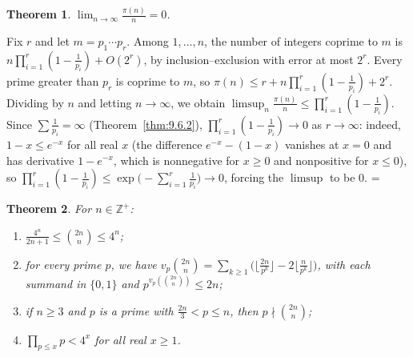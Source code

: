\documentclass[11pt]{article}
\makeatletter
\let\nt@closedisplay\]
\def\nt@guardedclose{\@ifnextchar\par{\nt@closeafterpar}{\@ifnextchar\end{\postdisplaypenalty\@M\nt@closedisplay}{\nt@closedisplay}}}
\def\nt@closeafterpar\par{\@ifnextchar\par{\nt@closeafterpar}{\@ifnextchar\end{\postdisplaypenalty\@M\nt@closedisplay\par}{\nt@closedisplay\par}}}
\renewenvironment{proof}[1][\proofname]{\par
  \pushQED{\qed}\normalfont\topsep\medskipamount\edef\nt@afterproof{\@endparpenalty=\the\@endparpenalty\relax}\@beginparpenalty\@M\@endparpenalty\@M\let\]\nt@guardedclose\trivlist\item[]\textit{#1\@addpunct{.}} \ignorespaces}{\ifvmode\addpenalty\@M\fi\popQED\nt@afterproof\endtrivlist\@endpefalse}
\theoremstyle{ntstyle}
\newtheorem{theorem}{Theorem}[subsection]
\makeatother
\begin{document}
\begin{theorem}\label{thm:9.6.3}
  $\lim_{n\to\infty}\tfrac{\pi(n)}{n} = 0$.

\end{theorem}

\begin{proof} Fix $r$ and let $m = p_1\cdots p_r$. Among
  $1,\ldots,n$, the number of integers coprime to $m$ is
  $n\prod_{i=1}^r(1-\tfrac{1}{p_i}) + O(2^r)$, by inclusion--exclusion with
  error at most $2^r$. Every prime greater than $p_r$ is coprime to $m$, so
  $\pi(n) \le r + n\prod_{i=1}^r(1-\tfrac{1}{p_i}) + 2^r$. Dividing by
  $n$ and letting $n\to\infty$, we obtain $\limsup_n \tfrac{\pi(n)}{n} \le \prod_{i=1}^r(1-\tfrac{1}{p_i})$. Since
  $\sum\tfrac{1}{p_i}=\infty$
  (Theorem~\ref{thm:9.6.2}), $\prod_{i=1}^r(1-\tfrac{1}{p_i})\to 0$ as
  $r\to\infty$: indeed, $1-x\le e^{-x}$ for all real $x$ (the difference
  $e^{-x}-(1-x)$ vanishes at $x=0$ and has derivative $1-e^{-x}$, which is
  nonnegative for $x\ge0$ and nonpositive for $x\le0$), so
  $\prod_{i=1}^{r}(1-\tfrac{1}{p_i})\le\exp\big(-\sum_{i=1}^{r}\tfrac{1}{p_i}\big)\to0$,
  forcing the $\limsup$ to be $0$.
\end{proof}

\begin{theorem}\label{thm:9.6.4} For $n\in\mathbb{Z}^+$:
  \begin{enumerate}[label={\alph*)}]
    \item $\tfrac{4^n}{2n+1}\le\binom{2n}{n}\le 4^n$;
    \item for every prime $p$,
          we have $v_p\!\binom{2n}{n}=\sum_{k\ge1}\big(\lfloor\tfrac{2n}{p^k}\rfloor-2\lfloor\tfrac{n}{p^k}\rfloor\big)$,
          with each summand in $\{0,1\}$ and
          $p^{v_p(\binom{2n}{n})}\le 2n$;
    \item if $n\ge3$ and $p$ is a prime with $\tfrac{2n}{3}<p\le n$, then
          $p\nmid\binom{2n}{n}$;
    \item $\prod_{p\le x}p<4^{x}$ for all real $x\ge1$.
  \end{enumerate}

\end{theorem}
\end{document}
